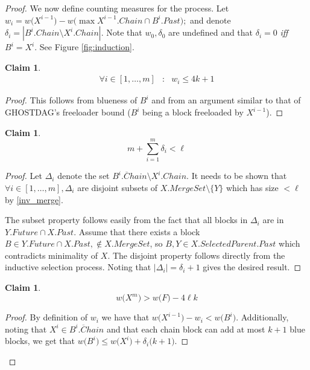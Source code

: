 \documentclass{article}
\theoremstyle{plain}
\theoremstyle{definition}
\newtheorem{claim}[]{Claim}
\theoremstyle{remark}
\newcommand{\score}[1]{{w\bigl(#1\bigr)}}
\newcommand{\comma}[2]{
    \begin{aligned}#1 & : & #2\end{aligned}
}
\begin{document}
\begin{proof}
    We now define counting measures for the process. Let 
    $w_i = \score{X^{i-1}} - \score{\max X^{i-1}.Chain \cap B^i.Past};$
    and denote $\delta_{i} = |B^{i}.Chain \setminus X^i.Chain|.$ 
    Note that $w_0, \delta_0$ are undefined and that $\delta_i = 0$ \emph{iff} $B^i = X^{i}$. See Figure \ref{fig:induction}.
    
    \begin{claim} \label{claim:freeload_dist}
        $$\comma{\forall i \in [1, \dots, m]}{w_i \le 4k + 1}$$ 
    \end{claim}
    \begin{proof}
        This follows from blueness of $B^i$ and from an argument similar to that of GHOSTDAG's \cite{sompolinsky2018phantom} freeloader bound ($B^i$ being a block freeloaded by $X^{i-1}$). 
    \end{proof}
    
    \begin{claim} \label{claim:mergeset_lim}
        $$m + \sum_{i=1}^m \delta_i < \ell$$
    \end{claim}
    \begin{proof}
        Let $\Delta_i$ denote the set $B^{i}.\overline{C}hain \setminus X^{i}.Chain$. It needs to be shown that $\forall i \in [1, \dots, m], \Delta_i$ are disjoint subsets of $X.MergeSet \setminus \{Y\}$ which has size $< \ell$ by \ref{inv_merge}. 
        
        The subset property follows easily from the fact that all blocks in $\Delta_i$ are in $Y.Future \cap X.Past$. Assume that there exists a block $B \in Y.Future \cap X.Past, \notin X.MergeSet$, so $B, Y \in X.SelectedParent.Past$ which contradicts minimality of $X$. 
        The disjoint property follows directly from the inductive selection process.  
        Noting that $|\Delta_i| = \delta_i + 1$ gives the desired result.
    \end{proof}
    
    \begin{claim} \label{claim:score_dist}
        $$\score{X^m} > \score{F} - 4 \ell k$$
    \end{claim}
    
    \begin{proof}
        By definition of $w_i$ we have that
        $\score{X^{i-1}} - w_i < \score{B^i}$. 
        Additionally, noting that $X^i \in B^i.\overline{C}hain$ and that each chain block can add at most $k+1$ blue blocks, we get that $\score{B^i} \le \score{X^{i}} + \delta_{i} \bigl(k+1\bigr)$.
        

\end{proof}
\end{proof}
\end{document}
